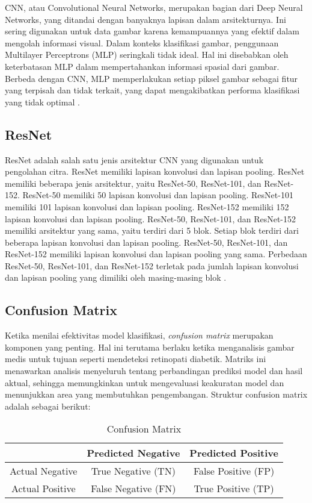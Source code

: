 CNN, atau Convolutional Neural Networks, merupakan bagian dari Deep Neural Networks, yang ditandai dengan banyaknya lapisan dalam arsitekturnya. Ini sering digunakan untuk data gambar karena kemampuannya yang efektif dalam mengolah informasi visual. Dalam konteks klasifikasi gambar, penggunaan Multilayer Perceptrons (MLP) seringkali tidak ideal. Hal ini disebabkan oleh keterbatasan MLP dalam mempertahankan informasi spasial dari gambar. Berbeda dengan CNN, MLP memperlakukan setiap piksel gambar sebagai fitur yang terpisah dan tidak terkait, yang dapat mengakibatkan performa klasifikasi yang tidak optimal \parencite{AstutiSamsuryadi2018}.

\subsection{ResNet}
\label{sec:224}

ResNet adalah salah satu jenis arsitektur CNN yang digunakan untuk pengolahan citra. ResNet memiliki lapisan konvolusi dan lapisan pooling. ResNet memiliki beberapa jenis arsitektur, yaitu ResNet-50, ResNet-101, dan ResNet-152. ResNet-50 memiliki 50 lapisan konvolusi dan lapisan pooling. ResNet-101 memiliki 101 lapisan konvolusi dan lapisan pooling. ResNet-152 memiliki 152 lapisan konvolusi dan lapisan pooling. ResNet-50, ResNet-101, dan ResNet-152 memiliki arsitektur yang sama, yaitu terdiri dari 5 blok. Setiap blok terdiri dari beberapa lapisan konvolusi dan lapisan pooling. ResNet-50, ResNet-101, dan ResNet-152 memiliki lapisan konvolusi dan lapisan pooling yang sama. Perbedaan ResNet-50, ResNet-101, dan ResNet-152 terletak pada jumlah lapisan konvolusi dan lapisan pooling yang dimiliki oleh masing-masing blok \parencite{He2016}.

\subsection{Confusion Matrix}
Ketika menilai efektivitas model klasifikasi, \emph{confusion matrix} merupakan komponen yang penting. Hal ini terutama berlaku ketika menganalisis gambar medis untuk tujuan seperti mendeteksi retinopati diabetik. Matriks ini menawarkan analisis menyeluruh tentang perbandingan prediksi model dan hasil aktual, sehingga memungkinkan untuk mengevaluasi keakuratan model dan menunjukkan area yang membutuhkan pengembangan.
Struktur confusion matrix adalah sebagai berikut:

\begin{table}[h]
    \centering
    \begin{tabular}{|c|c|c|}
        \hline
        & Predicted Negative & Predicted Positive \\
        \hline
        Actual Negative & True Negative (TN) & False Positive (FP) \\
        \hline
        Actual Positive & False Negative (FN) & True Positive (TP) \\
        \hline
    \end{tabular}
    \caption{Confusion Matrix}
    \label{tab:confusion_matrix}
\end{table}

